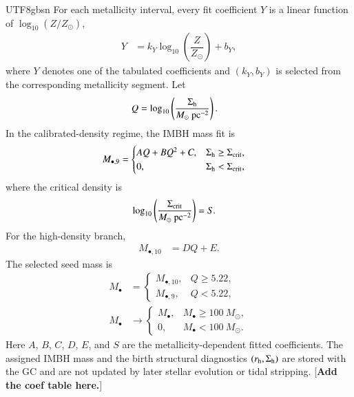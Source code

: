\documentclass[trackchanges, twocolappendix, twocolumn]{aastex701}
\newcommand{\czkong}[1]{{\color{magenta}[\textbf{#1}]}}
\begin{document}
\begin{CJK*}{UTF8}{gbsn}
For each metallicity interval, every fit coefficient $Y$ is a linear function of $\log_{10}(Z/Z_{\odot})$,
\begin{align}
Y & = k_Y\log_{10}\left(\dfrac{Z}{Z_{\odot}}\right)+b_Y,
\end{align}
where $Y$ denotes one of the tabulated coefficients and $(k_Y,b_Y)$ is selected from the corresponding metallicity segment. Let
\begin{align}
Q & = \log_{10}\left(\dfrac{\Sigma_{\rm h}}
{M_\odot~{\rm pc}^{-2}}\right).
\end{align}
In the calibrated-density regime, the IMBH mass fit is
\begin{align}
M_{\bullet,9} & =
\begin{cases}
AQ+BQ^2+C, & \Sigma_{\rm h}\geq\Sigma_{\rm crit},\\
0, & \Sigma_{\rm h}<\Sigma_{\rm crit},
\end{cases}
\end{align}
where the critical density is
\begin{align}
\log_{10}\left(\dfrac{\Sigma_{\rm crit}}
{M_\odot~{\rm pc}^{-2}}\right) & = S.
\end{align}
For the high-density branch,
\begin{align}
M_{\bullet,10} & = DQ+E.
\end{align}
The selected seed mass is
\begin{align}
M_{\bullet} & =
\begin{cases}
M_{\bullet,10}, & Q\geq5.22,\\
M_{\bullet,9}, & Q<5.22,
\end{cases}\\
M_{\bullet} & \rightarrow
\begin{cases}
M_{\bullet}, & M_{\bullet}\geq100~M_\odot,\\
0, & M_{\bullet}<100~M_\odot.
\end{cases}
\end{align}
Here $A$, $B$, $C$, $D$, $E$, and $S$ are the metallicity-dependent fitted coefficients. The assigned IMBH mass and the birth structural diagnostics $(r_{\rm h},\Sigma_{\rm h})$ are stored with the GC and are not updated by later stellar evolution or tidal stripping.
\czkong{Add the coef table here.}


\end{CJK*}
\end{document}
